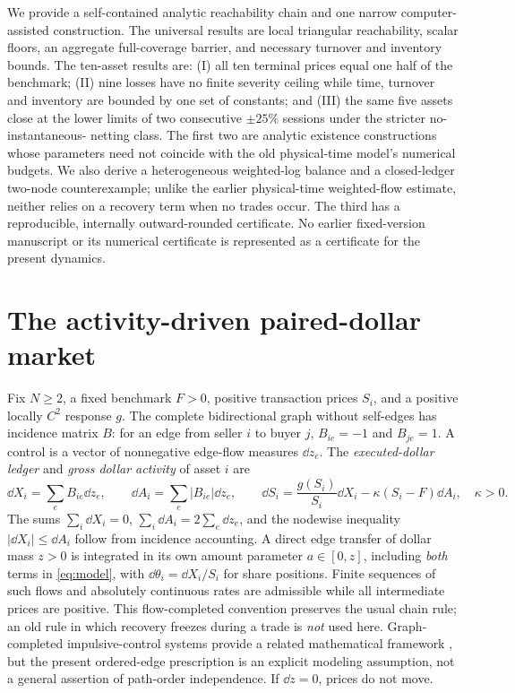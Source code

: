 \documentclass[review,hidelinks,onefignum,onetabnum]{siamonline250211}%
\begin{document}
We provide a self-contained analytic reachability chain and one narrow
computer-assisted construction. The universal results are local triangular
reachability, scalar floors, an aggregate full-coverage barrier, and necessary
turnover and inventory bounds. The ten-asset results are: (I) all ten
terminal prices equal one half of the benchmark; (II) nine losses have no
finite severity ceiling while time, turnover and inventory are bounded by
one set of constants; and (III) the same five assets close at the lower limits
of two consecutive $\pm25\%$ sessions under the stricter no-instantaneous-
netting class. The first two are analytic existence constructions whose
parameters need not coincide with the old physical-time model's numerical
budgets. We also derive a heterogeneous weighted-log balance and a
closed-ledger two-node counterexample; unlike the earlier physical-time
weighted-flow estimate, neither relies on a recovery term when no trades occur. The third has a reproducible, internally outward-rounded certificate.
No earlier fixed-version manuscript or its numerical certificate is
represented as a certificate for the present dynamics.

\section{The activity-driven paired-dollar market}\label{sec:model}
Fix $N\ge2$, a fixed benchmark $F>0$, positive transaction prices $S_i$,
and a positive locally $C^2$ response $g$. The complete bidirectional graph
without self-edges has incidence matrix $B$: for an edge from seller $i$ to
buyer $j$, $B_{ie}=-1$ and $B_{je}=1$. A control is a vector of nonnegative
edge-flow measures $\dd z_e$. The \emph{executed-dollar ledger} and \emph{gross
dollar activity} of asset $i$ are
\begin{equation}\label{eq:model}
 \dd X_i=\sum_e B_{ie}\dd z_e,\qquad
 \dd A_i=\sum_e|B_{ie}|\dd z_e,\qquad
 \boxed{\dd S_i=\frac{g(S_i)}{S_i}\dd X_i-\kappa(S_i-F)\dd A_i},\quad\kappa>0.
\end{equation}
The sums $\sum_i\dd X_i=0$, $\sum_i\dd A_i=2\sum_e\dd z_e$, and the
nodewise inequality $|\dd X_i|\le\dd A_i$ follow from incidence accounting.
A direct edge transfer of dollar mass $z>0$ is integrated in its own amount
parameter $a\in[0,z]$, including \emph{both} terms in \eqref{eq:model},
with $\dd\theta_i=\dd X_i/S_i$ for share positions. Finite sequences of such
flows and absolutely continuous rates are admissible while all intermediate
prices are positive. This flow-completed convention preserves the usual
chain rule; an old rule in which recovery freezes during a trade is \emph{not}
used here. Graph-completed impulsive-control systems provide a related
mathematical framework \citep{BressanRampazzo1988}, but the present
ordered-edge prescription is an explicit modeling assumption, not
a general assertion of path-order independence. If $\dd z=0$,
prices do not move.
\end{document}
